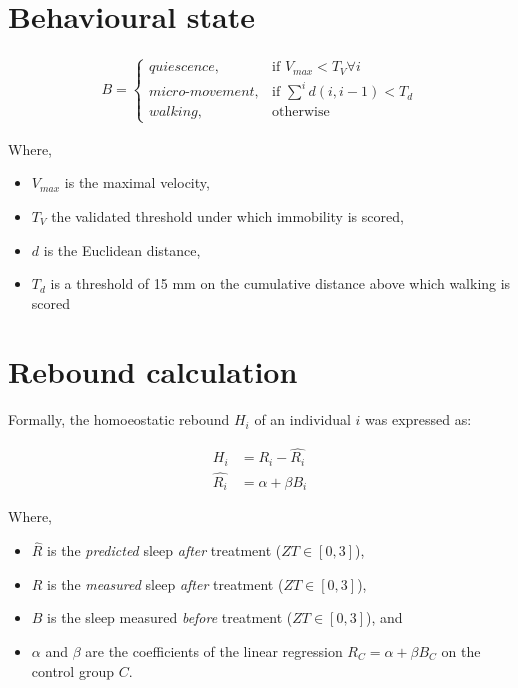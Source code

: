 \documentclass[a4paper,twoside,openright]{article}
\begin{document}
\section*{Behavioural state}

\begin{align}
B = 
\begin{cases}
quiescence,            & \text{if } V_{max} < T_V \forall i\\
micro\text{-}movement, & \text{if } \sum^{i}{d(i, i-1)} < T_d\\
walking,               & \text{otherwise}
\end{cases}
\end{align}



Where,
\begin{itemize}
	\item $V_{max}$ is the maximal velocity,
	\item $T_V$ the validated threshold under which immobility is scored,
	\item $d$ is the Euclidean distance,
	\item $T_d$ is a threshold of 15 mm on the cumulative distance above which walking is scored
\end{itemize}


\section*{Rebound calculation}
Formally, the homoeostatic rebound $H_i$ of an individual $i$ was expressed as:

\begin{align}
H_i &=  R_i - \hat{R_i} \\
\hat{R_i} &= \alpha + \beta{} B_i
\end{align}


Where,
\begin{itemize}
	\item $\hat{R}$ is the \emph{predicted} sleep \emph{after} treatment ($ZT \in [0, 3]$),
	\item $R$ is the \emph{measured} sleep \emph{after} treatment ($ZT \in [0, 3]$),
	\item $B$ is the sleep measured \emph{before} treatment ($ZT \in [0, 3]$), and
	\item $\alpha$ and $\beta$ are the coefficients of the linear regression $R_C = \alpha + \beta{B_C}$ on the control group $C$.
\end{itemize}
\end{document}
